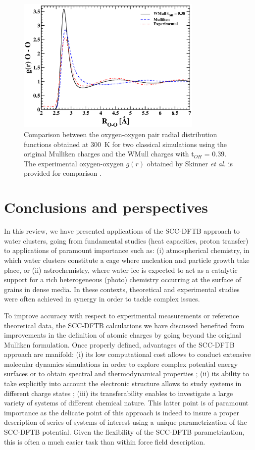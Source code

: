 \documentclass[]{interact}
\theoremstyle{plain}%
\theoremstyle{definition}
\theoremstyle{remark}
\begin{document}
\begin{figure}
\begin{center}
\includegraphics[width=9cm]{liquid_water.png}
\end{center}
\caption{Comparison between the oxygen-oxygen pair radial distribution functions obtained at 300~K for two classical
simulations using the original Mulliken charges and the WMull charges with t$_{OH}$ = 0.39. The experimental 
oxygen-oxygen $g(r)$ obtained by Skinner \textit{et al.} is provided for comparison \cite{Skinner2013}.}
\label{liquidwater}
\end{figure}

\section{Conclusions and perspectives}

In this review, we have presented applications of the SCC-DFTB approach to water clusters, going from fundamental studies (heat capacities,  proton transfer) to applications of paramount importance such as: (i) atmospherical chemistry, in which water clusters constitute a cage where nucleation and particle growth take place, or (ii) astrochemistry, where water ice is expected to act as a catalytic support for a rich heterogeneous (photo) chemistry occurring at the surface of grains in dense media.  In these contexts, theoretical and experimental studies were often achieved in synergy in order to tackle complex issues.

To improve accuracy with respect to experimental measurements or reference theoretical data, the SCC-DFTB calculations we have discussed
 benefited from improvements in the definition of  atomic charges by going beyond the original Mulliken formulation. Once properly defined,
 advantages of the SCC-DFTB approach are manifold: (i) its low computational cost  allows to conduct extensive molecular dynamics simulations in order to explore complex potential energy surfaces or to obtain spectral and thermodynamical properties ; (ii)  its ability to take explicitly into account  the electronic structure allows to study systems in different charge states ; (iii) its transferability enables to investigate a large variety of systems of different chemical nature. This latter point is of paramount importance as the delicate point of this approach is indeed to insure a proper description of  series of systems
 of interest using a unique parametrization of the SCC-DFTB potential. Given the flexibility of the SCC-DFTB parametrization, this is often a much
 easier task than within force field description.
\end{document}
